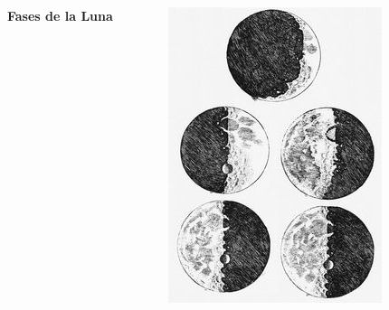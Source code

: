\documentclass{beamer}
\begin{document}
\begin{frame}
 \begin{columns}
  \begin{center}
  \Huge
  \textbf{Fases de la Luna}
  \end{center}
   \begin{figure}
    \centering
    \includegraphics[scale=0.6]{Imagenes/fases_lunares}
  \end{figure}
 \end{columns}
\end{frame}

\end{document}
